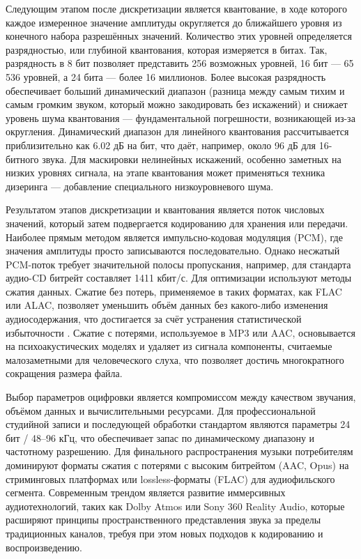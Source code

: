 \documentclass{SibFU-docs}
\begin{document}

Следующим этапом после дискретизации является квантование, в ходе которого каждое измеренное значение амплитуды округляется до ближайшего уровня из конечного набора разрешённых значений. Количество этих уровней определяется разрядностью, или глубиной квантования, которая измеряется в битах. Так, разрядность в 8 бит позволяет представить 256 возможных уровней, 16 бит — 65 536 уровней, а 24 бита — более 16 миллионов. Более высокая разрядность обеспечивает больший динамический диапазон (разница между самым тихим и самым громким звуком, который можно закодировать без искажений) и снижает уровень шума квантования — фундаментальной погрешности, возникающей из-за округления. Динамический диапазон для линейного квантования рассчитывается приблизительно как 6.02 дБ на бит, что даёт, например, около 96 дБ для 16-битного звука. Для маскировки нелинейных искажений, особенно заметных на низких уровнях сигнала, на этапе квантования может применяться техника дизеринга — добавление специального низкоуровневого шума.


Результатом этапов дискретизации и квантования является поток числовых значений, который затем подвергается кодированию для хранения или передачи. Наиболее прямым методом является импульсно-кодовая модуляция (PCM), где значения амплитуды просто записываются последовательно. Однако несжатый PCM-поток требует значительной полосы пропускания, например, для стандарта аудио-CD битрейт составляет 1411 кбит/с. Для оптимизации используют методы сжатия данных. Сжатие без потерь, применяемое в таких форматах, как FLAC или ALAC, позволяет уменьшить объём данных без какого-либо изменения аудиосодержания, что достигается за счёт устранения статистической избыточности \cite{xiph2024flac}. Сжатие с потерями, используемое в MP3 или AAC, основывается на психоакустических моделях и удаляет из сигнала компоненты, считаемые малозаметными для человеческого слуха, что позволяет достичь многократного сокращения размера файла.


Выбор параметров оцифровки является компромиссом между качеством звучания, объёмом данных и вычислительными ресурсами. Для профессиональной студийной записи и последующей обработки стандартом являются параметры 24 бит / 48–96 кГц, что обеспечивает запас по динамическому диапазону и частотному разрешению. Для финального распространения музыки потребителям доминируют форматы сжатия с потерями с высоким битрейтом (AAC, Opus) на стриминговых платформах или lossless-форматы (FLAC) для аудиофильского сегмента. Современным трендом является развитие иммерсивных аудиотехнологий, таких как Dolby Atmos или Sony 360 Reality Audio, которые расширяют принципы пространственного представления звука за пределы традиционных каналов, требуя при этом новых подходов к кодированию и воспроизведению.
\end{document}
